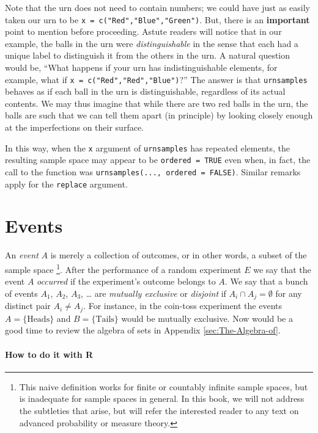 \documentclass[captions=tableheading]{scrbook}
\begin{document}
Note that the urn does not need to contain numbers; we could have just as easily taken our urn to be \texttt{x = c("Red","Blue","Green")}. But, there is an \textbf{important} point to mention before proceeding. Astute readers will notice that in our example, the balls in the urn were \textit{distinguishable} in the sense that each had a unique label to distinguish it from the others in the urn. A natural question would be, ``What happens if your urn has indistinguishable elements, for example, what if \texttt{x = c("Red","Red","Blue")}?'' The answer is that \texttt{urnsamples} behaves as if each ball in the urn is distinguishable, regardless of its actual contents. We may thus imagine that while there are two red balls in the urn, the balls are such that we can tell them apart (in principle) by looking closely enough at the imperfections on their
surface.

In this way, when the \texttt{x} argument of \texttt{urnsamples} has repeated elements, the resulting sample space may appear to be \texttt{ordered = TRUE} even when, in fact, the call to the function was \texttt{urnsamples(..., ordered = FALSE)}. Similar remarks apply for the \texttt{replace} argument. 
\section{Events}
\label{sec-3-2}

\label{sec:Events}

An \emph{event} \(A\) is merely a collection of outcomes, or in other words, a subset of the sample space
\footnote{This naive definition works for finite or countably infinite sample spaces, but is inadequate for sample spaces in general. In this book, we will not address the subtleties that arise, but will refer the interested reader to any text on advanced probability or measure theory.}.
After the performance of a random experiment \(E\) we say that the event \(A\) \emph{occurred} if the experiment's outcome belongs to \(A\). We say that a bunch of events \(A_{1}\), \(A_{2}\), \(A_{3}\), \ldots{} are \emph{mutually exclusive} or \emph{disjoint} if \(A_{i}\cap A_{j}=\emptyset\) for any distinct pair \(A_{i}\neq A_{j}\). For instance, in the coin-toss experiment the events \( A = \{ \mbox{Heads} \}\) and \( B = \{ \mbox{Tails} \} \) would be mutually exclusive. Now would be a good time to review the algebra of sets in Appendix \ref{sec:The-Algebra-of}.

\paragraph*{How to do it with \textsf{R}}
\end{document}
